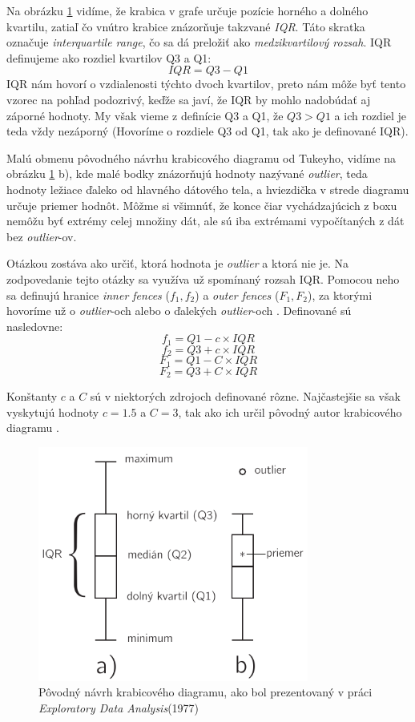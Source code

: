Na obrázku \ref{fig:boxplot} vidíme, že krabica v grafe určuje pozície horného a dolného kvartilu, zatiaľ čo vnútro krabice znázorňuje takzvané \textit{IQR}. Táto skratka označuje \textit{interquartile range}, čo sa dá preložiť ako \textit{medzikvartilový rozsah}. IQR definujeme ako rozdiel kvartilov Q3 a Q1:
\[
	IQR = Q3 - Q1
\]
IQR nám hovorí o vzdialenosti týchto dvoch kvartilov, preto nám môže byť tento vzorec na pohľad podozrivý, keďže sa javí, že IQR by mohlo nadobúdať aj záporné hodnoty. My však vieme z definície Q3 a Q1, že $ Q3 > Q1 $ a ich rozdiel je teda vždy nezáporný (Hovoríme o rozdiele Q3 od Q1, tak ako je definované IQR).

Malú obmenu pôvodného návrhu krabicového diagramu od Tukeyho, vidíme na obrázku \ref{fig:boxplot} b), kde malé bodky znázorňujú hodnoty nazývané \textit{outlier}, teda hodnoty ležiace ďaleko od hlavného dátového tela, a hviezdička v strede diagramu určuje priemer hodnôt. Môžme si všimnúť, že konce čiar vychádzajúcich z boxu nemôžu byť extrémy celej množiny dát, ale sú iba extrémami vypočítaných z dát bez \textit{outlier}-ov.

Otázkou zostáva ako určiť, ktorá hodnota je \textit{outlier} a ktorá nie je. Na zodpovedanie tejto otázky sa využíva už spomínaný rozsah IQR. Pomocou neho sa definujú hranice \textit{inner fences} ($f_{1}, f_{2}$) a \textit{outer fences} ($F_{1}, F_{2}$), za ktorými hovoríme už o \textit{outlier}-och alebo o ďalekých \textit{outlier}-och \cite{Schwertman}. Definované sú nasledovne:
\\
\[f_{1} = Q1 - c \times IQR\]	
\[f_{2} = Q3 + c \times IQR\]
\[F_{1} = Q1 - C \times IQR\]
\[F_{2} = Q3 + C \times IQR\]

Konštanty $ c $ a $ C $ sú v niektorých zdrojoch definované rôzne. Najčastejšie sa však vyskytujú hodnoty $ c = 1.5 $ a $ C = 3$, tak ako ich určil pôvodný autor krabicového diagramu \cite{Tukey}.

\begin{figure}
	\centering
	\includegraphics[width = 3.5in]{boxplot}
	\caption{Pôvodný návrh krabicového diagramu, ako bol prezentovaný v práci \textit{Exploratory Data Analysis}(1977) \cite{Tukey} }
	\label{fig:boxplot}
\end{figure}


